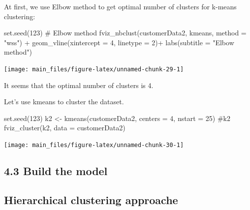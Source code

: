 At first, we use Elbow method to get optimal number of clusters for
k-means clustering:

\begin{Schunk}
\begin{Sinput}
set.seed(123)
# Elbow method
fviz_nbclust(customerData2, kmeans, method = "wss") +
    geom_vline(xintercept = 4, linetype = 2)+
  labs(subtitle = "Elbow method")
\end{Sinput}


\begin{center}\texttt{[image: main\_files/figure-latex/unnamed-chunk-29-1]} \end{center}

\end{Schunk}

It seems that the optimal number of clusters is 4.

Let's use kmeans to cluster the dataset.

\begin{Schunk}
\begin{Sinput}
set.seed(123)
k2 <- kmeans(customerData2, centers = 4, nstart = 25)
#k2
fviz_cluster(k2, data = customerData2)
\end{Sinput}


\begin{center}\texttt{[image: main\_files/figure-latex/unnamed-chunk-30-1]} \end{center}

\end{Schunk}

\begin{Schunk}
\end{Schunk}

\hypertarget{build-the-model-3}{%
\subsection{4.3 Build the model}\label{build-the-model-3}}

\hypertarget{hierarchical-clustering-approache}{%
\subsection{Hierarchical clustering
approache}\label{hierarchical-clustering-approache}}

